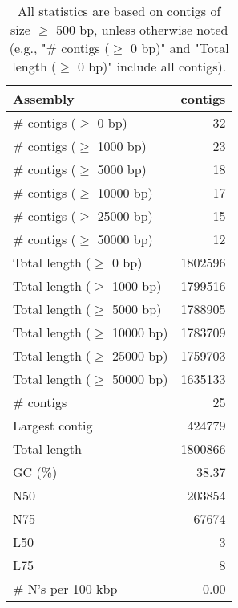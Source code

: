 \documentclass[12pt,a4paper]{article}
\begin{document}
\begin{table}[ht]
\begin{center}
\caption{All statistics are based on contigs of size $\geq$ 500 bp, unless otherwise noted (e.g., "\# contigs ($\geq$ 0 bp)" and "Total length ($\geq$ 0 bp)" include all contigs).}
\begin{tabular}{|l*{1}{|r}|}
\hline
Assembly & contigs \\ \hline
\# contigs ($\geq$ 0 bp) & 32 \\ \hline
\# contigs ($\geq$ 1000 bp) & 23 \\ \hline
\# contigs ($\geq$ 5000 bp) & 18 \\ \hline
\# contigs ($\geq$ 10000 bp) & 17 \\ \hline
\# contigs ($\geq$ 25000 bp) & 15 \\ \hline
\# contigs ($\geq$ 50000 bp) & 12 \\ \hline
Total length ($\geq$ 0 bp) & 1802596 \\ \hline
Total length ($\geq$ 1000 bp) & 1799516 \\ \hline
Total length ($\geq$ 5000 bp) & 1788905 \\ \hline
Total length ($\geq$ 10000 bp) & 1783709 \\ \hline
Total length ($\geq$ 25000 bp) & 1759703 \\ \hline
Total length ($\geq$ 50000 bp) & 1635133 \\ \hline
\# contigs & 25 \\ \hline
Largest contig & 424779 \\ \hline
Total length & 1800866 \\ \hline
GC (\%) & 38.37 \\ \hline
N50 & 203854 \\ \hline
N75 & 67674 \\ \hline
L50 & 3 \\ \hline
L75 & 8 \\ \hline
\# N's per 100 kbp & 0.00 \\ \hline
\end{tabular}
\end{center}
\end{table}
\end{document}
